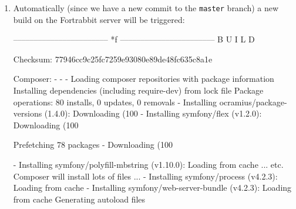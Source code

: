 \documentclass[a4paperpaper,openright]{book}
\newenvironment{Shaded}{}{}
\newcommand{\BuiltInTok}[1]{#1}
\newcommand{\ExtensionTok}[1]{#1}
\newcommand{\KeywordTok}[1]{\textcolor[rgb]{0.00,0.44,0.13}{\textbf{#1}}}
\newcommand{\NormalTok}[1]{#1}
\newcommand{\StringTok}[1]{\textcolor[rgb]{0.25,0.44,0.63}{#1}}
\begin{document}
\begin{enumerate}
\begin{Shaded}
\end{Shaded}
\item
  Automatically (since we have a new commit to the \texttt{master}
  branch) a new build on the Fortrabbit server will be triggered:

\begin{Shaded}
\begin{Highlighting}[]
\NormalTok{    –––––––––––––––––––––––  }\ExtensionTok{*}\NormalTok{ƒ  –––––––––––––––––––––––}
    \ExtensionTok{B}\NormalTok{ U I L D}

    \ExtensionTok{Checksum}\NormalTok{:}
      \ExtensionTok{77946cc9c25fc7259e93080e89de48fc635c8a1e}

    \ExtensionTok{Composer}\NormalTok{:}
      \ExtensionTok{-}\NormalTok{ - -}
      \ExtensionTok{Loading}\NormalTok{ composer repositories with package information}
      \ExtensionTok{Installing}\NormalTok{ dependencies (including require-dev) }\ExtensionTok{from}\NormalTok{ lock file}
      \ExtensionTok{Package}\NormalTok{ operations: 80 installs, 0 updates, 0 removals}
        \ExtensionTok{-}\NormalTok{ Installing ocramius/package-versions (1.4.0)}\BuiltInTok{:}\NormalTok{ Downloading (100%
        \ExtensionTok{-}\NormalTok{ Installing symfony/flex (v1.2.0)}\BuiltInTok{:}\NormalTok{ Downloading (100%

      \ExtensionTok{Prefetching}\NormalTok{ 78 packages}
        \ExtensionTok{-}\NormalTok{ Downloading (100%

        \ExtensionTok{-}\NormalTok{ Installing symfony/polyfill-mbstring (v1.10.0)}\BuiltInTok{:}\NormalTok{ Loading from cache}
            \ExtensionTok{...}\NormalTok{ etc. Composer will install lots of files ...}
        \ExtensionTok{-}\NormalTok{ Installing symfony/process (v4.2.3)}\BuiltInTok{:}\NormalTok{ Loading from cache}
        \ExtensionTok{-}\NormalTok{ Installing symfony/web-server-bundle (v4.2.3)}\BuiltInTok{:}\NormalTok{ Loading from cache}
      \ExtensionTok{Generating}\NormalTok{ autoload files}

}}}
\end{Highlighting}
\end{Shaded}
\end{enumerate}
\end{document}
